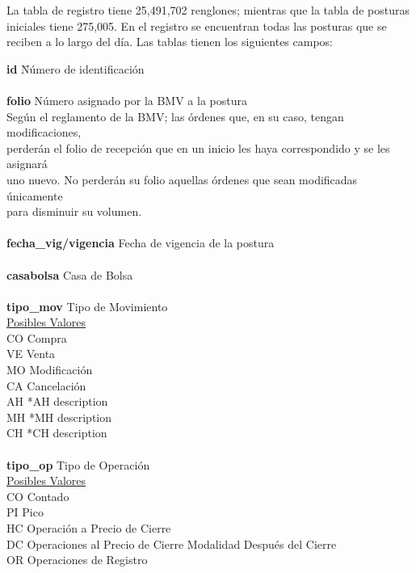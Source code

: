 \documentclass[10pt]{article}
\begin{document}
La tabla de registro tiene 25,491,702 renglones; mientras que la tabla de posturas iniciales tiene 275,005. En el registro se encuentran todas las posturas que se reciben a lo largo del día. Las tablas tienen los siguientes campos:\\

\noindent
\begin{tabbing}
\textbf{id} \hspace{3cm} \= Número de identificación \hspace{1cm} \= \\
\\
\textbf{folio} \> Número asignado por la BMV a la postura\\
Según el reglamento de la BMV; las órdenes que, en su caso, tengan modificaciones,\\
perderán el folio de recepción que en un inicio les haya correspondido y se les asignará\\
uno nuevo. No perderán su folio aquellas órdenes que sean modificadas únicamente\\
para disminuir su volumen.\\
\\
\textbf{fecha\_vig/vigencia} \> Fecha de vigencia de la postura \\
\\
\textbf{casabolsa} \> Casa de Bolsa\\
\\
\textbf{tipo\_mov} \> Tipo de Movimiento\\
\underline{Posibles Valores} \\
CO \> Compra\\
VE \> Venta\\
MO \> Modificación\\
CA \> Cancelación\\
AH \> *AH description\\
MH \> *MH description\\
CH \> *CH description\\
\\
\textbf{tipo\_op} \> Tipo de Operación\\
\underline{Posibles Valores} \\
CO \> Contado\\
PI \> Pico\\
HC \> Operación a Precio de Cierre\\
DC \> Operaciones al Precio de Cierre Modalidad Después del Cierre\\
OR \> Operaciones de Registro\\

\end{tabbing}
\end{document}

